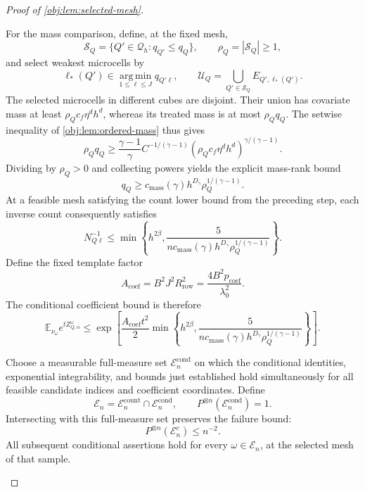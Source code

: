 \documentclass[11pt]{article}
\begin{document}
\begin{proof}[Proof of \cref{obj:lem:selected-mesh}]
\begin{enumerate}
For the mass comparison, define, at the fixed mesh,
\[
\mathcal S_Q=\{Q'\in\mathcal Q_h:q_{Q'}\le q_Q\},
\qquad
\rho_Q=|\mathcal S_Q|\ge1,
\]
and select weakest microcells by
\[
\ell_*(Q')\in
\operatorname*{arg\,min}_{1\le\ell\le J}q_{Q'\ell},
\qquad
\mathcal U_Q=\bigcup_{Q'\in\mathcal S_Q}E_{Q',\ell_*(Q')}.
\]
The selected microcells in different cubes are disjoint. Their union
has covariate mass at least \(\rho_Qc_f\eta^dh^d\), whereas its treated
mass is at most \(\rho_Qq_Q\). The setwise inequality of
\cref{obj:lem:ordered-mass} thus gives
\[
\rho_Qq_Q
\ge
\frac{\gamma-1}{\gamma}C^{-1/(\gamma-1)}
(\rho_Qc_f\eta^dh^d)^{\gamma/(\gamma-1)}.
\]
Dividing by \(\rho_Q>0\) and collecting powers yields the explicit
mass-rank bound
\[
q_Q\ge
c_{\mathrm{mass}}(\gamma)h^{D_\gamma}
\rho_Q^{1/(\gamma-1)}.
\]
At a feasible mesh satisfying the count lower bound from the preceding
step, each inverse count consequently satisfies
\[
N_{Q\ell}^{-1}
\le
\min\!\left\{
h^{2\beta},
\frac{5}{
n c_{\mathrm{mass}}(\gamma)h^{D_\gamma}
\rho_Q^{1/(\gamma-1)}}
\right\}.
\]
Define the fixed template factor
\[
A_{\mathrm{coef}}
=
B^2J^2R_{\mathrm{row}}^2
=
\frac{4B^2p_{\mathrm{coef}}}{\lambda_0^2}.
\]
The conditional coefficient bound is therefore
\[
\mathbb E_{\nu_\omega}e^{tZ_{Q,\alpha}^\omega}
\le
\exp\!\left[
\frac{A_{\mathrm{coef}}t^2}{2}
\min\!\left\{
h^{2\beta},
\frac{5}{
n c_{\mathrm{mass}}(\gamma)h^{D_\gamma}
\rho_Q^{1/(\gamma-1)}}
\right\}
\right].
\]

Choose a measurable full-measure set
\(\mathcal E_n^{\mathrm{cond}}\) on which the conditional identities,
exponential integrability, and bounds just established hold
simultaneously for all feasible candidate indices and coefficient
coordinates. Define
\[
\mathcal E_n
=
\mathcal E_n^{\mathrm{count}}\cap\mathcal E_n^{\mathrm{cond}},
\qquad
P^{\otimes n}(\mathcal E_n^{\mathrm{cond}})=1.
\]
Intersecting with this full-measure set preserves the failure bound:
\[
P^{\otimes n}(\mathcal E_n^c)\le n^{-2}.
\]
All subsequent conditional assertions hold for every \(\omega\in\mathcal
E_n\), at the selected mesh of that sample.


\end{enumerate}
\end{proof}
\end{document}
